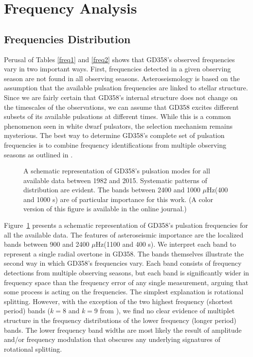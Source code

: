 \documentclass[12pt,preprint]{aastex}
\newcommand{\muHz}{\mbox{$\mu$Hz}}
\begin{document}
\section{Frequency Analysis}\label{analysis}

\subsection{Frequencies Distribution}

Perusal of Tables \ref{freq1} and \ref{freq2} shows that GD358's observed frequencies vary in two
important ways.  First, frequencies detected in a given observing season are not found 
in all observing seasons. Asteroseismology is based on the assumption that the available pulsation
frequencies are linked to stellar structure.  Since we are fairly certain that GD358's internal structure 
does not change on the timescales of the observations, we can assume that GD358 excites 
different subsets of its available pulsations at different times. While this is a common phenomenon
seen in white dwarf pulsators, the selection mechanism remains mysterious. The best way to 
determine GD358's complete set of pulsation frequencies is to combine frequency identifications 
from multiple observing seasons as outlined in \citep{Kleinman98}.  

\begin{figure}
\caption{A schematic representation of GD358's pulsation modes for all available data between
1982 and 2015. Systematic patterns of distribution are evident. The bands between 2400 and 1000
\muHz (400 and 1000 s) are of particular importance for this work. (A color version of this 
figure is available in the online journal.)
\label{schematic}
}
\end{figure}

Figure~\ref{schematic} presents a schematic representation of GD358's pulsation frequencies for all the 
available data. The features of asteroseismic importance are the localized bands between 900 and 2400
\muHz (1100 and 400 s). We interpret each band to represent a single radial overtone in GD358. The bands
themselves illustrate the second way in which GD358's frequencies vary. Each band consists of 
frequency detections from multiple observing seasons, but each band is significantly wider in 
frequency space than the frequency error of any single measurement, arguing that some process 
is acting on the frequencies. The simplest explanation is rotational splitting.  However, with the 
exception of the two highest frequency (shortest period) bands ($k=8$ and $k=9$ 
from \citet{Provencal09}), we find no clear evidence of multiplet structure in the frequency 
distributions of the lower frequency (longer period) bands. The lower frequency band widths are 
most likely the result of amplitude and/or frequency modulation that obscures any underlying 
signatures of rotational splitting.  
\end{document}
